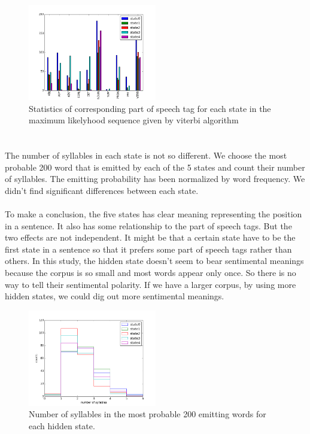  \begin{figure}[h]
 \centering
 \includegraphics[width=0.5\textwidth]{./figure/hiddenstate_partofspeechtag.png}
 \caption{Statistics of corresponding part of speech tag for each state in the maximum likelyhood sequence given by viterbi algorithm}
 \end{figure}
\paragraph{}
\vspace{35pt}
\section*{}
The number of syllables in each state is not so different. We choose the most probable 200 word that is emitted by each of the 5 states and count their number of syllables. The emitting probability has been normalized by word frequency. We didn’t find significant differences between each state. 


\paragraph{}
To make a conclusion, the five states has clear meaning representing the position in a sentence. It also has some relationship to the part of speech tags. But the two effects are not independent. It might be that a certain state have to be the first state in a sentence so that it prefers some part of speech tags rather than others. In this study, the hidden state doesn't seem to bear sentimental meanings because the corpus is so small and most words appear only once. So there is no way to tell their sentimental polarity. If we have a larger corpus, by using more hidden states, we could dig out more sentimental meanings. 
 \begin{figure}
 \centering
 \includegraphics[width=0.5\textwidth]{./figure/numberofsyllablesinstates.png}
 \caption{Number of syllables in the most probable 200 emitting words for each hidden state.}
\end{figure}
